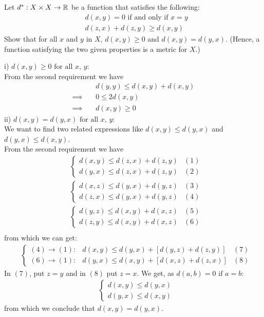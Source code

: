 \subsection{}
\begin{tcolorbox}
Let $d^*:X \times X \rightarrow \mathbb{R}$ be a function that satisfies the following:
\begin{align*}
&d(x,y)=0 \text{ if and only if } x=y\\
&d(z,x)+d(z,y)\geq d(x,y)
\end{align*}
Show that for all $x$ and $y$ in $X$, $d(x,y)\geq 0$ and $d(x,y)=d(y,x)$. (Hence, a function satisfying the two given properties is a metric for $X$.)
\end{tcolorbox}
i) $d(x,y)\geq 0 \text{ for all  } x,\,y $:\\
From the second requirement we have
\begin{align*}
&d(y,y)\leq d(x,y)+d(x,y)\\
\implies\quad &0\leq 2d(x,y)\\
\implies\quad &d(x,y)\geq 0
\end{align*}
ii) $d(x,y)=d(y,x)\text{ for all  } x,\,y $:\\
We want to find two related expressions like $d(x,y)\leq d(y,x)$ and $d(y,x)\leq d(x,y)$.\\
From the second requirement we have
\begin{align*}
&\left\{\begin{array}{ll}
d(x,y)\leq d(z,x)+d(z,y)&(1)\\
d(y,x)\leq d(z,x)+d(z,y)&(2)
\end{array}\right.\\
&\left\{\begin{array}{ll}
d(x,z)\leq d(y,x)+d(y,z)&(3)\\
d(z,x)\leq d(y,x)+d(y,z)&(4)
\end{array}\right.\\&\left\{\begin{array}{ll}
d(y,z)\leq d(x,y)+d(x,z)&(5)\\
d(z,y)\leq d(x,y)+d(x,z)&(6)
\end{array}\right.\\
\end{align*}
from which we can get:
\begin{align*}
&\left\{\begin{array}{llc}
(4)\rightarrow (1): &d(x,y)\leq d(y,x)+ [d(y,z)+d(z,y)]&(7)\\
(6)\rightarrow (1):&d(y,x)\leq d(x,y)+ [d(x,z)+d(z,x)]&(8)
\end{array}\right.
\end{align*}
In $(7)$, put $z=y$ and in $(8)$ put $z=x$. We get, as $d(a,b)=0\text{ if } a=b$:
\begin{align*}
&\left\{\begin{array}{l}
d(x,y)\leq d(y,x)\\
d(y,x)\leq d(x,y)
\end{array}\right.
\end{align*}
from which we conclude that $d(x,y)=d(y,x)$.

